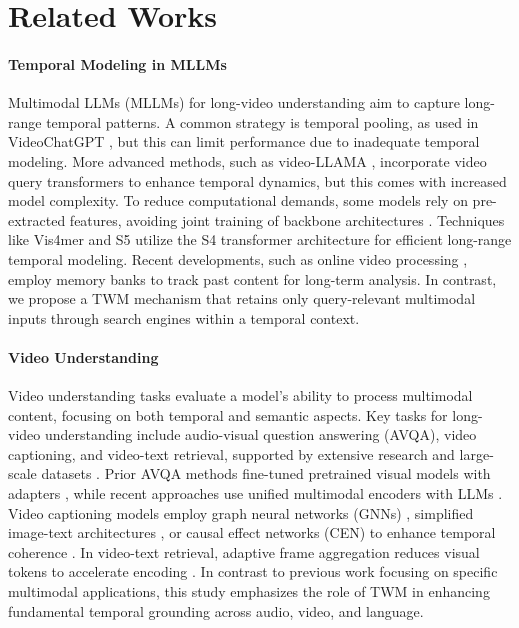 \section{Related Works}
\label{related_works}
\paragraph{Temporal Modeling in MLLMs}
Multimodal LLMs (MLLMs) for long-video understanding aim to capture long-range temporal patterns. A common strategy is temporal pooling, as used in VideoChatGPT \cite{maaz2023video}, but this can limit performance due to inadequate temporal modeling. More advanced methods, such as video-LLAMA \cite{zhang2023video}, incorporate video query transformers to enhance temporal dynamics, but this comes with increased model complexity. To reduce computational demands, some models rely on pre-extracted features, avoiding joint training of backbone architectures \cite{hussein2019timeception, liu2024breaking, wu2021towards}. Techniques like Vis4mer \cite{islam2022long} and S5 \cite{wang2023selective} utilize the S4 transformer architecture \cite{gu2021efficiently} for efficient long-range temporal modeling. Recent developments, such as online video processing \cite{he2024ma}, employ memory banks to track past content for long-term analysis. In contrast, we propose a TWM mechanism that retains only query-relevant multimodal inputs through search engines within a temporal context.

\paragraph{Video Understanding}
Video understanding tasks evaluate a model's ability to process multimodal content, focusing on both temporal and semantic aspects. Key tasks for long-video understanding include audio-visual question answering (AVQA), video captioning, and video-text retrieval, supported by extensive research and large-scale datasets \cite{liu2024tackling, xu2016msr, bain2020condensed}. Prior AVQA methods fine-tuned pretrained visual models with adapters \cite{liu2024tackling, Lin_2023_CVPR, NEURIPS2023_af01716e, diao2024learning}, while recent approaches use unified multimodal encoders with LLMs \cite{Han_2024_CVPR}. Video captioning models employ graph neural networks (GNNs) \cite{hendria2023action}, simplified image-text architectures \cite{wang2022git}, or causal effect networks (CEN) to enhance temporal coherence \cite{nadeem2024narrativebridge}. In video-text retrieval, adaptive frame aggregation reduces visual tokens to accelerate encoding \cite{ren2023testa}.
In contrast to previous work focusing on specific multimodal applications, this study emphasizes the role of TWM in enhancing fundamental temporal grounding across audio, video, and language.